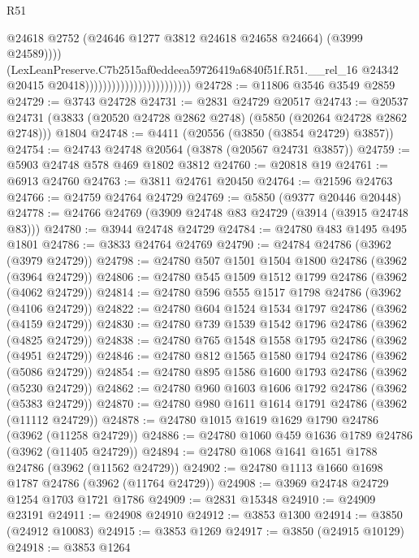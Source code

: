 \begin{lexlean}{R51}
\begin{coremodule}
                                                        @24618
                                                        @2752
                                                        (@24646 @1277 @3812 @24618 @24658 @24664)
                                                        (@3999 @24589))))
                                                  (LexLeanPreserve.C7b2515af0eddeea59726419a6840f51f.R51.__rel_16
                                                    @24342
                                                    @20415
                                                    @20418))))))))))))))))))))))))
@24728 := @11806 @3546 @3549 @2859
@24729 := @3743 @24728
@24731 := @2831 @24729 @20517
@24743 := @20537
    @24731
    (@3833 (@20520 @24728 @2862 @2748) (@5850 (@20264 @24728 @2862 @2748)))
    @1804
@24748 := @4411 (@20556 (@3850 (@3854 @24729) @3857))
@24754 := @24743 @24748 @20564 (@3878 (@20567 @24731 @3857))
@24759 := @5903 @24748 @578 @469 @1802 @3812
@24760 := @20818 @19
@24761 := @6913 @24760
@24763 := @3811 @24761 @20450
@24764 := @21596 @24763
@24766 := @24759 @24764 @24729
@24769 := @5850 (@9377 @20446 @20448)
@24778 := @24766 @24769 (@3909 @24748 @83 @24729 (@3914 (@3915 @24748 @83)))
@24780 := @3944 @24748 @24729
@24784 := @24780 @483 @1495 @495 @1801
@24786 := @3833 @24764 @24769
@24790 := @24784 @24786 (@3962 (@3979 @24729))
@24798 := @24780 @507 @1501 @1504 @1800 @24786 (@3962 (@3964 @24729))
@24806 := @24780 @545 @1509 @1512 @1799 @24786 (@3962 (@4062 @24729))
@24814 := @24780 @596 @555 @1517 @1798 @24786 (@3962 (@4106 @24729))
@24822 := @24780 @604 @1524 @1534 @1797 @24786 (@3962 (@4159 @24729))
@24830 := @24780 @739 @1539 @1542 @1796 @24786 (@3962 (@4825 @24729))
@24838 := @24780 @765 @1548 @1558 @1795 @24786 (@3962 (@4951 @24729))
@24846 := @24780 @812 @1565 @1580 @1794 @24786 (@3962 (@5086 @24729))
@24854 := @24780 @895 @1586 @1600 @1793 @24786 (@3962 (@5230 @24729))
@24862 := @24780 @960 @1603 @1606 @1792 @24786 (@3962 (@5383 @24729))
@24870 := @24780 @980 @1611 @1614 @1791 @24786 (@3962 (@11112 @24729))
@24878 := @24780 @1015 @1619 @1629 @1790 @24786 (@3962 (@11258 @24729))
@24886 := @24780 @1060 @459 @1636 @1789 @24786 (@3962 (@11405 @24729))
@24894 := @24780 @1068 @1641 @1651 @1788 @24786 (@3962 (@11562 @24729))
@24902 := @24780 @1113 @1660 @1698 @1787 @24786 (@3962 (@11764 @24729))
@24908 := @3969 @24748 @24729 @1254 @1703 @1721 @1786
@24909 := @2831 @15348
@24910 := @24909 @23191
@24911 := @24908 @24910
@24912 := @3853 @1300
@24914 := @3850 (@24912 @10083)
@24915 := @3853 @1269
@24917 := @3850 (@24915 @10129)
@24918 := @3853 @1264

\end{coremodule}
\end{lexlean}
